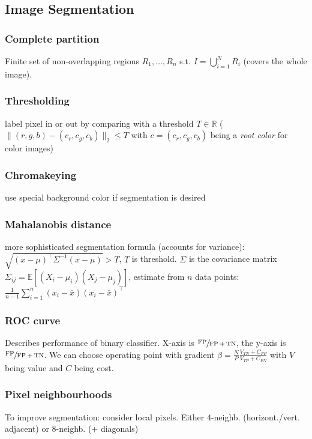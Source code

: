 \documentclass[a4paper,10pt]{article}
\begin{document}
\subsection{Image Segmentation}
\subsubsection{Complete partition} 
Finite set of non-overlapping regions \( R_1, \dots, R_n \) s.t. \( I = \bigcup_{i=1}^N R_i \) (covers the whole image). 

\subsubsection{Thresholding} 
label pixel in or out by comparing with a threshold \( T \in \mathbb{R} \) (\( \lVert (r,g,b) - (c_r,c_g,c_b) \rVert_2 \le T \) with \( c = (c_r,c_g,c_b) \) being a \textit{root color} for color images)

\subsubsection{Chromakeying}
use special background color if segmentation is desired 

\subsubsection{Mahalanobis distance} 
more sophisticated segmentation formula (accounts for variance): \( \sqrt{(x - \mu)^\top \Sigma^{-1}(x - \mu)} > T \), \( T \) is threshold. \( \Sigma  \) is the covariance matrix\\ \( \Sigma_{ij} = \mathbb{E}\left[(X_i - \mu_i)(X_j - \mu_j) \right] \), estimate from \( n \) data points: \( \frac{1}{n-1} \sum_{i=1}^{n} (x_i - \bar{x})(x_i - \bar{x})^\top \)

\subsubsection{ROC curve} 
Describes performance of binary classifier. X-axis is \( \sfrac{\text{FP}}{\text{FP}+\text{TN}} \), the y-axis is \( \sfrac{\text{FP}}{\text{FP} + \text{TN}} \). We can choose operating point with gradient \( \beta = \frac{N}{P} \frac{V_{TN} + C_{FP}}{V_{TP} + C_{FN}} \) with \( V \) being value and \( C \) being cost.

\subsubsection{Pixel neighbourhoods}
To improve segmentation: consider local pixels. Either 4-neighb. (horizont./vert. adjacent) or 8-neighb. (+ diagonals)
\end{document}
